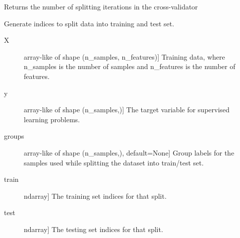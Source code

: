 \documentclass[letterpaper,10pt,english]{sphinxmanual}
\begin{document}
\begin{fulllineitems}
\begin{fulllineitems}
\label{\detokenize{api/mastml.data_splitters.SklearnDataSplitter:mastml.data_splitters.SklearnDataSplitter.get_n_splits}}
Returns the number of splitting iterations in the cross-validator

\end{fulllineitems}


\begin{fulllineitems}
\label{\detokenize{api/mastml.data_splitters.SklearnDataSplitter:mastml.data_splitters.SklearnDataSplitter.split}}
Generate indices to split data into training and test set.
\begin{description}
\item[{X}] \leavevmode{[}array-like of shape (n\_samples, n\_features){]}
Training data, where n\_samples is the number of samples
and n\_features is the number of features.

\item[{y}] \leavevmode{[}array-like of shape (n\_samples,){]}
The target variable for supervised learning problems.

\item[{groups}] \leavevmode{[}array-like of shape (n\_samples,), default=None{]}
Group labels for the samples used while splitting the dataset into
train/test set.

\end{description}
\begin{description}
\item[{train}] \leavevmode{[}ndarray{]}
The training set indices for that split.

\item[{test}] \leavevmode{[}ndarray{]}
The testing set indices for that split.

\end{description}

\end{fulllineitems}


\end{fulllineitems}
\end{document}
